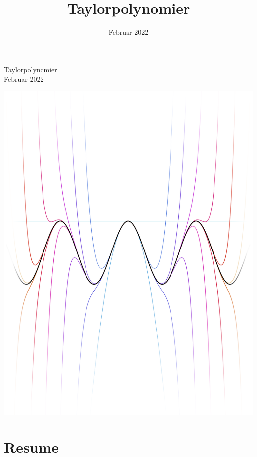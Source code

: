 \documentclass[12pt, a4paper]{article}
\title{Taylorpolynomier}
\date{Februar 2022}
\begin{document}
\begin{titlepage}
   \centering
    \vfill
    {\huge 
    Taylorpolynomier\\
    \vspace{0.5cm}
    \large
    Februar 2022
    }    
    \vfill
   
    \includegraphics[width=\textwidth]{figures/forside4edit.png} %
    \vfill
    \vfill
\thispagestyle{empty}

\end{titlepage}
\section*{Resume} %
\blindtext[1-2]
\tableofcontents
\newpage
\end{document}
